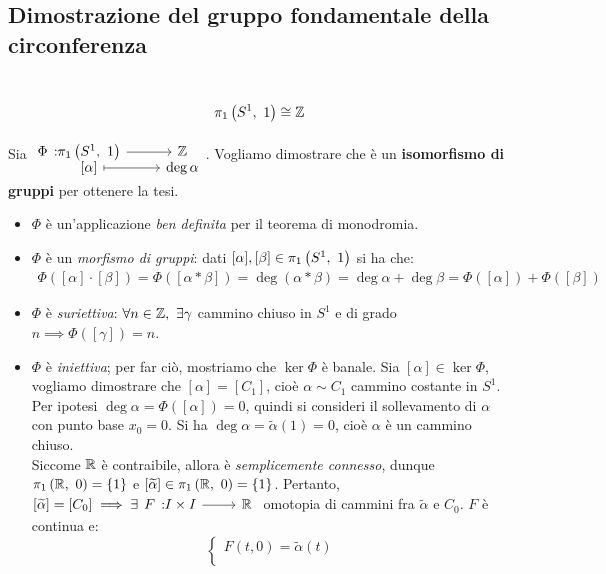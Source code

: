 \subsection{Dimostrazione del gruppo fondamentale della circonferenza}
\begin{theorema}~{}\\
	\begin{equation}
		\gruf{S^1}{1}\cong\integerset
	\end{equation}
\vspace{-6mm}
\end{theorema}
\begin{demonstration}
	Sia $\displaystyle \funztot \Phi {\gruf{S^1}{1}} \integerset {\left[\alpha\right]} {\deg\alpha}$. Vogliamo dimostrare che è un \textbf{isomorfismo di gruppi} per ottenere la tesi.
		\begin{itemize}
			\item $\Phi$ è un'applicazione \textit{ben definita} per il teorema di monodromia.
			\item $\Phi$ è un \textit{morfismo di gruppi}: dati $[\alpha],[\beta]\in\gruf{S^1}{1}$ si ha che:
				\begin{gather*}
					\Phi([\alpha]\cdot [\beta])=\Phi([\alpha\ast\beta])=\deg(\alpha\ast\beta)=\deg\alpha+\deg\beta=\Phi([\alpha])+\Phi([\beta])
				\end{gather*}
			\item $\Phi$ è \textit{suriettiva}: $\forall n\in\mathbb{Z},\ \exists \gamma$ cammino chiuso in $S^1$ e di grado $n\implies \Phi([\gamma])=n$.
			\item $\Phi$ è \textit{iniettiva}; per far ciò, mostriamo che $\ker\Phi$ è banale. Sia $[\alpha]\in\ker\Phi$, vogliamo dimostrare che $[\alpha]=[C_1]$, cioè $\alpha\sim C_1$ cammino costante in $S^1$. Per ipotesi $\deg\alpha=\Phi([\alpha])=0$, quindi si consideri il sollevamento di $\alpha$ con punto base $x_0=0$. Si ha $\deg\alpha=\widetilde{\alpha}(1)=0$, cioè $\alpha$ è un cammino chiuso. \\
			Siccome $\mathbb{R}$ è contraibile, allora è \textit{semplicemente connesso}, dunque $\gruf{\realset}{0}=\left\{1\right\}$ e $[\widetilde{\alpha}]\in\gruf{\realset}{0}=\left\{1\right\}$.
			Pertanto, $[\widetilde{\alpha}]=[C_0]\implies \exists \funz F {I\times I}  \realset$ omotopia di cammini fra $\widetilde{\alpha}$ e $C_0$. $F$ è continua e:
			\begin{equation*}
				\begin{cases}
					F(t,0)=\widetilde{\alpha}(t)\\

\end{cases}
\end{equation*}
\end{itemize}
\end{demonstration}
